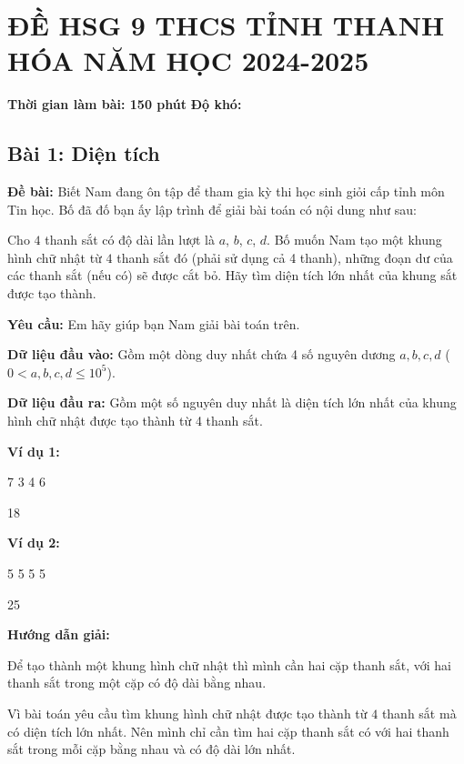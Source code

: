 \documentclass[12pt]{scrartcl}  %
\begin{document}
\section{ĐỀ HSG 9 THCS TỈNH THANH HÓA NĂM HỌC 2024-2025}
\textbf{Thời gian làm bài: 150 phút}
\textbf{Độ khó: }
\subsection{Bài 1: Diện tích}
\textbf{Đề bài:}
Biết Nam đang ôn tập để tham gia kỳ thi học sinh giỏi cấp tỉnh môn Tin học. Bố đã đố bạn ấy lập trình để giải bài toán có nội dung như sau:

Cho $4$ thanh sắt có độ dài lần lượt là $a$, $b$, $c$, $d$. Bố muốn Nam tạo một khung hình chữ nhật từ $4$ thanh sắt đó (phải sử dụng cả 4 thanh), những đoạn dư của các thanh sắt 
(nếu có) sẽ được cắt bỏ. Hãy tìm diện tích lớn nhất của khung sắt được tạo thành.

\textbf{Yêu cầu:}
Em hãy giúp bạn Nam giải bài toán trên.

\textbf{Dữ liệu đầu vào:}
Gồm một dòng duy nhất chứa 4 số nguyên dương $a, b, c, d$ ($0 < a, b, c, d \leq 10^5$).

\textbf{Dữ liệu đầu ra:}
Gồm một số nguyên duy nhất là diện tích lớn nhất của khung hình chữ nhật được tạo thành từ 4 thanh sắt.

\textbf{Ví dụ 1:}
\begin{tcolorbox}[colback=gray!5!white, colframe=blue!50!black, title=Input]
7 3 4 6
\end{tcolorbox}
\begin{tcolorbox}[colback=gray!5!white, colframe=green!50!black, title=Output]
18
\end{tcolorbox}

\textbf{Ví dụ 2:}
\begin{tcolorbox}[colback=gray!5!white, colframe=blue!50!black, title=Input]
5 5 5 5
\end{tcolorbox}
\begin{tcolorbox}[colback=gray!5!white, colframe=green!50!black, title=Output]
25
\end{tcolorbox}
\textbf{Hướng dẫn giải:}

Để tạo thành một khung hình chữ nhật thì mình cần hai cặp
thanh sắt, với hai thanh sắt trong một cặp có độ dài bằng nhau.

Vì bài toán yêu cầu tìm khung hình chữ nhật được tạo thành từ
$4$ thanh sắt mà có diện tích lớn nhất. Nên mình chỉ cần tìm
hai cặp thanh sắt có với hai thanh sắt trong mỗi cặp bằng nhau và
có độ dài lớn nhất.
\end{document}
